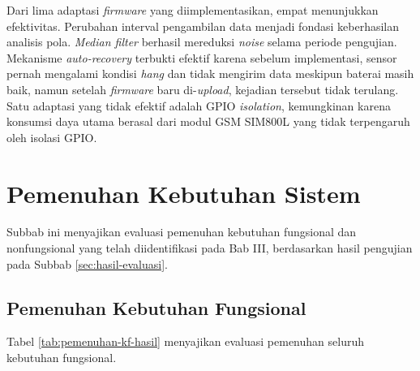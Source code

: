 Dari lima adaptasi \textit{firmware} yang diimplementasikan, empat menunjukkan efektivitas. Perubahan interval pengambilan data menjadi fondasi keberhasilan analisis pola. \textit{Median filter} berhasil mereduksi \textit{noise} selama periode pengujian. Mekanisme \textit{auto-recovery} terbukti efektif karena sebelum implementasi, sensor pernah mengalami kondisi \textit{hang} dan tidak mengirim data meskipun baterai masih baik, namun setelah \textit{firmware} baru di-\textit{upload}, kejadian tersebut tidak terulang. Satu adaptasi yang tidak efektif adalah GPIO \textit{isolation}, kemungkinan karena konsumsi daya utama berasal dari modul GSM SIM800L yang tidak terpengaruh oleh isolasi GPIO.

\section{Pemenuhan Kebutuhan Sistem}
\label{sec:pemenuhan-kebutuhan}

Subbab ini menyajikan evaluasi pemenuhan kebutuhan fungsional dan nonfungsional yang telah diidentifikasi pada Bab III, berdasarkan hasil pengujian pada Subbab \ref{sec:hasil-evaluasi}.

\subsection{Pemenuhan Kebutuhan Fungsional}

Tabel \ref{tab:pemenuhan-kf-hasil} menyajikan evaluasi pemenuhan seluruh kebutuhan fungsional.

